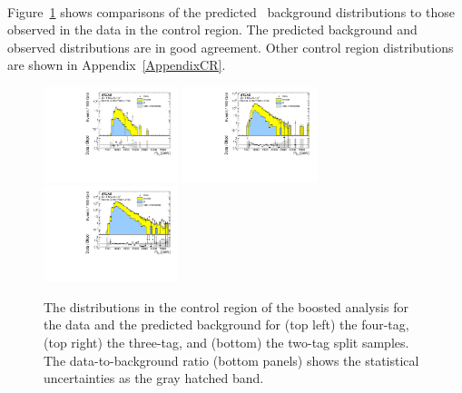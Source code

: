 \paragraph{}
Figure~\ref{fig:boosted-cr-mjj} shows comparisons of the predicted \mtwoJ~background distributions to those observed in the data in the control region.
The predicted background and observed distributions are in good agreement.
Other control region distributions are shown in Appendix~\ref{AppendixCR}.

\begin{figure}[htbp!]
\begin{center}
 \includegraphics[width=0.35\textwidth,angle=-90]{figures/boosted/Paperplot/Moriond_bkg_9_FourTag_Control_mHH_l_1.pdf}
 \includegraphics[width=0.35\textwidth,angle=-90]{figures/boosted/Paperplot/Moriond_bkg_9_ThreeTag_Control_mHH_l_1.pdf}\\
 \includegraphics[width=0.35\textwidth,angle=-90]{figures/boosted/Paperplot/Moriond_bkg_9_TwoTag_split_Control_mHH_l_1.pdf}\\
\caption{The \mtwoJ distributions in the control region of the boosted analysis for the data and the predicted background for (top left) the four-tag, (top right) the three-tag, and (bottom) the two-tag split samples. The data-to-background ratio (bottom panels) shows the statistical uncertainties as the gray hatched band.}
\label{fig:boosted-cr-mjj}
\end{center}
\end{figure}


